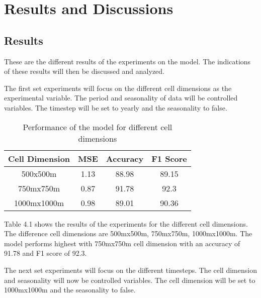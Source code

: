 
\chapter{Results and Discussions}  %

\section{Results}
    These are the different results of the experiments on the model. The indications of these results will then be discussed and analyzed.

    The first set experiments will focus on the different cell dimensions as the experimental variable. The period and seasonality of data will be controlled variables. The timestep will be set to yearly and the seasonality to false.

    \begin{table}[H]
      \centering
      \begin{tabular}{|c|c|c|c|}
            \hline
          \textbf{Cell Dimension}  &\textbf{MSE}  &\textbf{Accuracy} &\textbf{F1 Score}\\ 
          \hline
          500x500m &1.13 &88.98 &89.15 \\
          750mx750m &0.87 &91.78 &92.3 \\
          1000mx1000m  &0.98 &89.01 &90.36 \\
          \hline
        \end{tabular}
      \caption{Performance of the model for different cell dimensions}
    \end{table}
    Table 4.1 shows the results of the experiments for the different cell dimensions. The difference cell dimensions are 500mx500m, 750mx750m, 1000mx1000m. The model performs highest with 750mx750m cell dimension with an accuracy of 91.78 and F1 score of 92.3.

    The next set experiments will focus on the different timesteps. The cell dimension and seasonality will now be controlled variables. The cell dimension will be set to 1000mx1000m and the seasonality to false.

